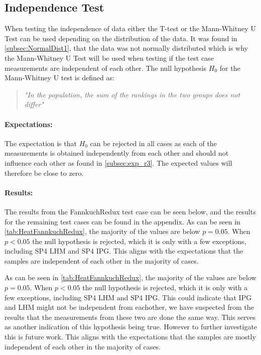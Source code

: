 

\subsection{Independence Test}\label{subsec:independence1}

When testing the independence of data either the T-test or the Mann-Whitney U Test can be used depending on the distribution of the data. It was found in \cref{subsec:NormalDist1}, that the data was not normally distributed which is why the Mann-Whitney U Test will be used when testing if the test case measurements are independent of each other. The null hypothesis $H_0$ for the Mann-Whitney U test is defined as:

\begin{quote}
    \textit{"In the population, the sum of the rankings in the two groups does not differ"}\cite*[]{mann1947test}
\end{quote}

\paragraph{Expectations:} The expectation is that $H_0$ can be rejected in all cases as each of the measurements is obtained independently from each other and should not influence each other as found in \cref{subsec:exp_r3}. The expected values will therefore be close to zero.

\paragraph{Results:}
The results from the FannkuchRedux test case can be seen below, and the results for the remaining test cases can be found in the appendix. As can be seen in \cref{tab:HeatFannkuchRedux}, the majority of the values are below $p = 0.05$. When $p < 0.05$ the null hypothesis is rejected, which it is only with a few exceptions, including SP4 LHM and SP4 IPG. This aligns with the expectations that the samples are independent of each other in the majority of cases.

 

As can be seen in \cref{tab:HeatFannkuchRedux}, the majority of the values are below $p = 0.05$. When $p < 0.05$ the null hypothesis is rejected, which it is only with a few exceptions, including SP4 LHM and SP4 IPG. This could indicate that IPG and LHM might not be independent from eachother, we have suspected from the results that the measurements from these two are done the same way. This serves as another indication of this hypothesis being true. However to further investigate this is future work.
This aligns with the expectations that the samples are mostly independent of each other in the majority of cases.

